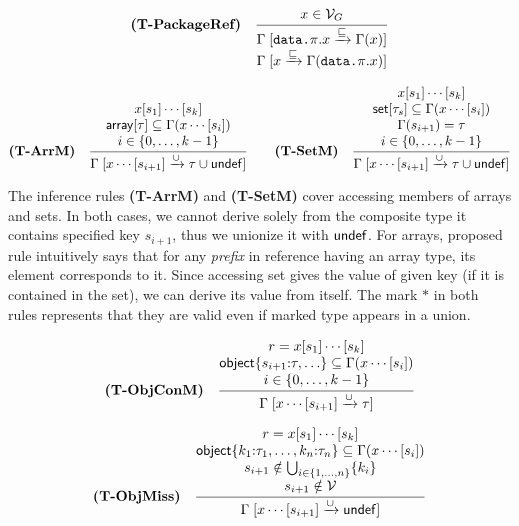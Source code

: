 \[
\textbf{(T-PackageRef)}\quad
\inferrule{
  x \in \Globals
}{
  \begin{array}{@{}c@{}}
    \refine{\texttt{data.}\pkg.x}{\typof(x)} \\
    \refine{x}{\typof(\texttt{data.}\pkg.x)}
  \end{array}
}
\]

\[
\textbf{(T-ArrM)}\quad
\inferrule{
  x[s_1]\cdots[s_k] \\
  \Array{\ty} \subseteq \typof(x\cdots[s_i]) \\
  \ranges{i}{0}{k-1}
}{
  \unionize{x\cdots[s_{i+1}]}{\ty \cup \Undef}
}
\qquad
\textbf{(T-SetM)}\quad
\inferrule{
  x[s_1]\cdots[s_k] \\
  \RegoSet{\ty_s} \subseteq \typof(x\cdots[s_i]) \\
  \typof(s_{i+1}) = \ty \\
  \ranges{i}{0}{k-1}
}{
  \unionize{x\cdots[s_{i+1}]}{\ty \cup \Undef}
}
\]

The inference rules \textbf{(T-ArrM)} and \textbf{(T-SetM)} cover accessing members of arrays and sets.
In both cases, we cannot derive solely from the composite type it contains specified key $s_{i+1}$, thus we unionize it with $\mathsf{undef}$.
For arrays, proposed rule intuitively says that for any \emph{prefix} in reference having an array type, its element corresponds to it.
Since accessing set gives the value of given key (if it is contained in the set), we can derive its value from itself.
The mark $*$ in both rules represents that they are valid even if marked type appears in a union.

\[
\textbf{(T-ObjConM)}\quad
\inferrule{
  r = x[s_1]\cdots[s_k] \\
  \Obj{s_{i+1}{:} \ty, \ldots} \subseteq \typof(x\cdots[s_i]) \\
  \ranges{i}{0}{k-1}
}{
  \unionize{x\cdots[s_{i+1}]}{\ty}
}
\]

\vspace{1mm}
\[
\textbf{(T-ObjMiss)}\quad
\inferrule{
  r = x[s_1]\cdots[s_k] \\
  \Obj{k_1{:}\ty_1,\ldots,k_n{:}\ty_n} \subseteq \typof(x\cdots[s_i]) \\
  s_{i+1} \notin \bigcup_{\ranges{i}{1}{n}}\{k_i\} \\
  s_{i+1} \notin \Vars
}{
  \unionize{x\cdots[s_{i+1}]}{\Undef}
}
\]

